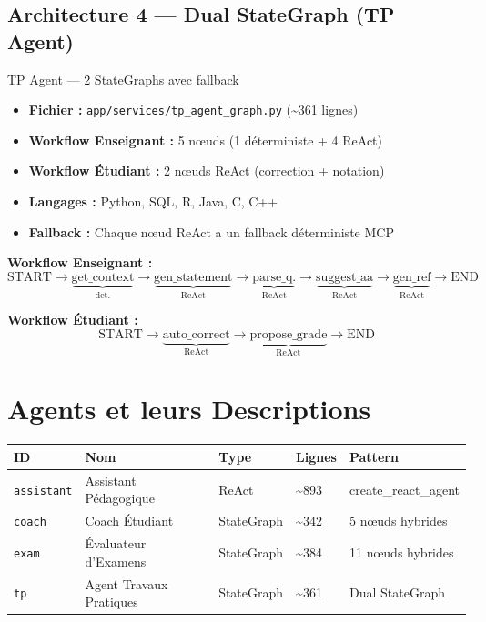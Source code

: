 \documentclass[12pt,a4paper]{article}
\begin{document}
\subsection{Architecture 4 --- Dual StateGraph (TP Agent)}

\begin{agentbox}[breakable]{TP Agent --- 2 StateGraphs avec fallback}
\begin{itemize}[noitemsep]
  \item \textbf{Fichier :} \texttt{app/services/tp\_agent\_graph.py} (\textasciitilde361 lignes)
  \item \textbf{Workflow Enseignant :} 5 nœuds (1 déterministe + 4 ReAct)
  \item \textbf{Workflow Étudiant :} 2 nœuds ReAct (correction + notation)
  \item \textbf{Langages :} Python, SQL, R, Java, C, C++
  \item \textbf{Fallback :} Chaque nœud ReAct a un fallback déterministe MCP
\end{itemize}
\end{agentbox}

\textbf{Workflow Enseignant :}
\[
\text{START} \to \underbrace{\text{get\_context}}_{\text{det.}} \to \underbrace{\text{gen\_statement}}_{\text{ReAct}} \to \underbrace{\text{parse\_q.}}_{\text{ReAct}} \to \underbrace{\text{suggest\_aa}}_{\text{ReAct}} \to \underbrace{\text{gen\_ref}}_{\text{ReAct}} \to \text{END}
\]

\textbf{Workflow Étudiant :}
\[
\text{START} \to \underbrace{\text{auto\_correct}}_{\text{ReAct}} \to \underbrace{\text{propose\_grade}}_{\text{ReAct}} \to \text{END}
\]

\section{Agents et leurs Descriptions}

\begin{longtable}{lllll}
\toprule
\textbf{ID} & \textbf{Nom} & \textbf{Type} & \textbf{Lignes} & \textbf{Pattern} \\
\midrule
\texttt{assistant} & Assistant Pédagogique & ReAct & \textasciitilde893 & create\_react\_agent \\
\texttt{coach} & Coach Étudiant & StateGraph & \textasciitilde342 & 5 nœuds hybrides \\
\texttt{exam} & Évaluateur d'Examens & StateGraph & \textasciitilde384 & 11 nœuds hybrides \\
\texttt{tp} & Agent Travaux Pratiques & StateGraph & \textasciitilde361 & Dual StateGraph \\
\bottomrule
\end{longtable}
\end{document}
